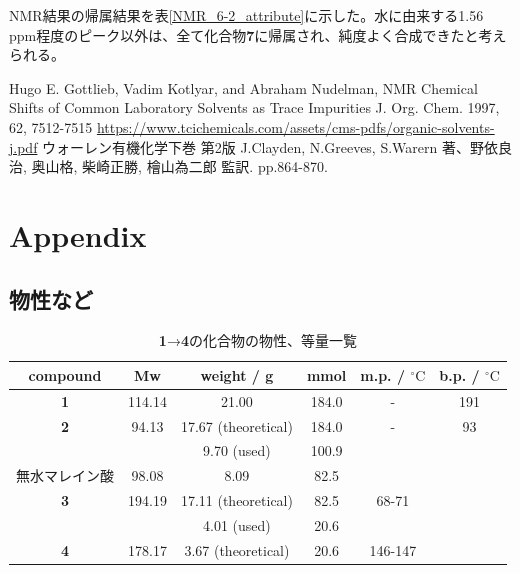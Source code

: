 \documentclass{ltjsarticle}
\theoremstyle{definition}
\numberwithin{equation}{section}
\newcommand{\D}{^\circ\text{C}}
\begin{document}
 NMR結果の帰属結果を表\ref{NMR_6-2_attribute}に示した。水に由来する1.56 ppm程度のピーク以外は、全て化合物\textbf{7}に帰属され、純度よく合成できたと考えられる。


\begin{thebibliography}{99}
Hugo E. Gottlieb, Vadim Kotlyar, and
Abraham Nudelman, 
NMR Chemical Shifts of Common
Laboratory Solvents as Trace Impurities
J. Org. Chem. 1997, 62, 7512-7515
\url{https://www.tcichemicals.com/assets/cms-pdfs/organic-solvents-j.pdf}
ウォーレン有機化学下巻 第2版 J.Clayden, N.Greeves, S.Warern 著、野依良治, 奥山格, 柴崎正勝, 檜山為二郎 監訳. pp.864-870.
\end{thebibliography}

\newpage
\section{Appendix}
\subsection{物性など}
\begin{table}[htp]
\caption{\textbf{1}→\textbf{4}の化合物の物性、等量一覧}
\begin{center}
\begin{tabular}{cccccc}
\toprule
compound & Mw & weight / g & mmol & m.p. / $\D$ & b.p. / $\D$\\
\midrule
\textbf{1} & 114.14 & 21.00 & 184.0 & - & 191\\
\textbf{2} & 94.13 & 17.67 (theoretical) & 184.0 & - & 93\\
  &  & 9.70 (used) & 100.9 & \\
無水マレイン酸 & 98.08 & 8.09  & 82.5 & \\
\textbf{3} & 194.19 & 17.11 (theoretical) & 82.5 & 68-71 & \\
  &  & 4.01 (used) & 20.6 & \\
\textbf{4} & 178.17 & 3.67 (theoretical) & 20.6 & 146-147 & \\
\bottomrule
\end{tabular}
\end{center}
\label{properties_6-1}
\end{table}%
\end{document}
